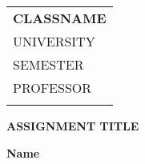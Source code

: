 \documentclass[10pt]{article}
\begin{document}
\thispagestyle{empty}

\begin{tabular}{p{15.5cm}}
  {\large \bf CLASSNAME} \\ UNIVERSITY \\ SEMESTER \\ PROFESSOR \\ \hline \\
\end{tabular}

\vspace{3mm}

\begin{center}
  {\Large \bf ASSIGNMENT TITLE}
  \vspace{2mm}

  {\bf Name}
\end{center}

\vspace{4mm}
\end{document}
